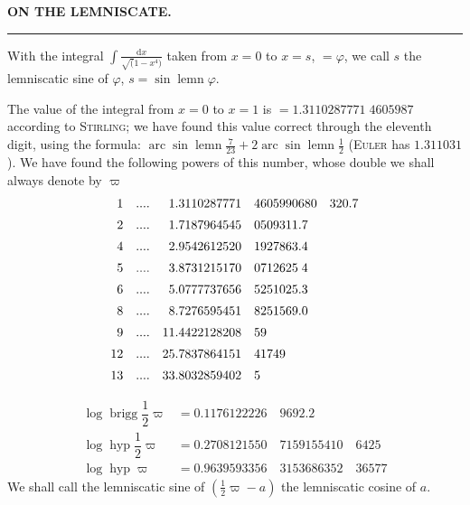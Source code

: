 \begingroup
\renewcommand{\arraystretch}{1.45}
\clearpage{}

\begin{center}
\textbf{ON THE LEMNISCATE.}\par\medskip
\rule{2cm}{0.3pt}
\end{center}

With the integral $\int\frac{\mathrm{d}x}{\surd(1-x^4)}$ taken from $x=0$ to $x=s$, $=\varphi$, we call $s$ the lemniscatic sine of $\varphi$, $s=\sin\operatorname{lemn}\varphi$.

The value of the integral from $x=0$ to $x=1$ is $=1.3110287771\;4605987$ according to \textsc{Stirling}; we have found this value correct through the eleventh digit, using the formula: $\operatorname{arc}\sin\operatorname{lemn}\frac{7}{23}+2\operatorname{arc}\sin\operatorname{lemn}\frac12$ (\textsc{Euler} has $1.311031$). We have found the following powers of this number, whose double we shall always denote by $\varpi$
\[
\begin{array}{r@{\quad}c@{\quad}r@{\quad}l@{\quad}l}
1& \mathord{.}\mathord{.}\mathord{.}\mathord{.} &1.3110287771&4605990680&320.7\\[5pt]
2& \mathord{.}\mathord{.}\mathord{.}\mathord{.} &1.7187964545&0509311.7&\\[5pt]
4& \mathord{.}\mathord{.}\mathord{.}\mathord{.} &2.9542612520&1927863.4&\\[5pt]
5& \mathord{.}\mathord{.}\mathord{.}\mathord{.} &3.8731215170&0712625\;4&\\[5pt]
6& \mathord{.}\mathord{.}\mathord{.}\mathord{.} &5.0777737656&5251025.3&\\[5pt]
8& \mathord{.}\mathord{.}\mathord{.}\mathord{.} &8.7276595451&8251569.0&\\[5pt]
9& \mathord{.}\mathord{.}\mathord{.}\mathord{.} &11.4422128208&59&\\[5pt]
12& \mathord{.}\mathord{.}\mathord{.}\mathord{.} &25.7837864151&41749&\\[5pt]
13& \mathord{.}\mathord{.}\mathord{.}\mathord{.} &33.8032859402&5&
\end{array}
\]


\[
\begin{aligned}
\operatorname{log}\operatorname{brigg}\dfrac12\varpi&=0.1176122226\quad9692.2\\[5pt]
\operatorname{log}\operatorname{hyp}\dfrac12\varpi&=0.2708121550\quad7159155410\quad6425\\[5pt]
\operatorname{log}\operatorname{hyp}\varpi&=0.9639593356\quad3153686352\quad36577
\end{aligned}
\]
We shall call the lemniscatic sine of $(\tfrac12\varpi-a)$ the lemniscatic cosine of $a$.

